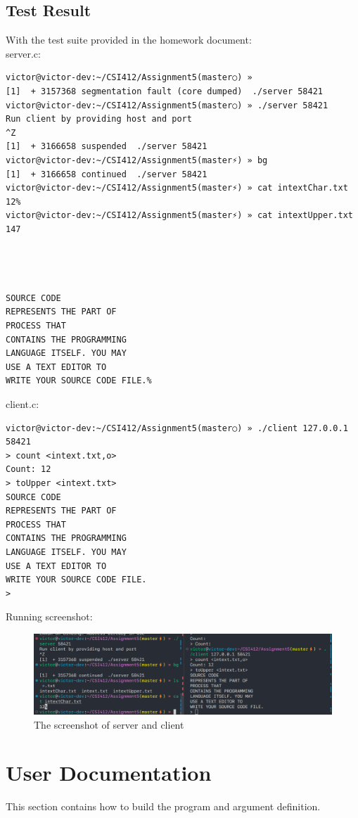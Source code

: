\documentclass{article}
\begin{document}
\subsection{Test Result}
With the test suite provided in the homework document: \\
server.c: 
\begin{verbatim}
victor@victor-dev:~/CSI412/Assignment5(master○) » 
[1]  + 3157368 segmentation fault (core dumped)  ./server 58421
victor@victor-dev:~/CSI412/Assignment5(master○) » ./server 58421
Run client by providing host and port
^Z
[1]  + 3166658 suspended  ./server 58421
victor@victor-dev:~/CSI412/Assignment5(master⚡) » bg 
[1]  + 3166658 continued  ./server 58421
victor@victor-dev:~/CSI412/Assignment5(master⚡) » cat intextChar.txt
12%                                                  
victor@victor-dev:~/CSI412/Assignment5(master⚡) » cat intextUpper.txt 
147




SOURCE CODE
REPRESENTS THE PART OF
PROCESS THAT
CONTAINS THE PROGRAMMING
LANGUAGE ITSELF. YOU MAY
USE A TEXT EDITOR TO
WRITE YOUR SOURCE CODE FILE.%
\end{verbatim}
client.c:
\begin{verbatim}
victor@victor-dev:~/CSI412/Assignment5(master○) » ./client 127.0.0.1 58421
> count <intext.txt,o>
Count: 12
> toUpper <intext.txt>
SOURCE CODE
REPRESENTS THE PART OF
PROCESS THAT
CONTAINS THE PROGRAMMING
LANGUAGE ITSELF. YOU MAY
USE A TEXT EDITOR TO
WRITE YOUR SOURCE CODE FILE.
>
\end{verbatim}

Running screenshot:

\begin{figure}[H]
    \centering
    \includegraphics[width=15cm, screenshot]{img/assignment5_run_result.png}
    \caption{The screenshot of server and client}
\end{figure}

\section{User Documentation}
This section contains how to build the program and argument definition.
\end{document}
